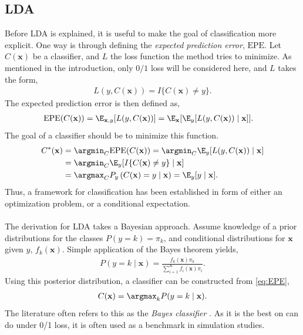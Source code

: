 \subsection{LDA}
\label{sub:LDA}
Before LDA is explained, it is useful to make the goal of classification more explicit. One way is through defining the \textit{expected prediction error}, $\mathrm{EPE}$.
Let $ C(\mathbf{x})$ be a classifier, and $L$ the loss function the method tries to minimize. As mentioned in the introduction, only $0/1$ loss will be considered here, and $L$ takes the form,
\begin{align}
  L(y, C(\mathbf{x})) = I\{ C(\mathbf{x}) \neq y \}. 
\end{align}
The expected prediction error is then defined as,
\begin{align}
  \mathrm{EPE}(C(\mathbf{x})) 
  &= \E_{\mathbf{x}, y}[L(y, C(\mathbf{x}))] = \E_{\mathbf{x}}[\E_{y}[L(y, C(\mathbf{x})) \mid  \mathbf{x}]].
\end{align}
The goal of a classifier should be to minimize this function.
\begin{align}
  C^*(\mathbf{x}) 
  &= \argmin_{ C} \mathrm{EPE}(C(\mathbf{x})) = \argmin_{ C} \E_{y}[L(y,  C(\mathbf{x})) \mid  \mathbf{x}] \notag \\
  &= \argmin_{ C} \E_{y}[I\{ C(\mathbf{x}) \neq y \} \mid  \mathbf{x}] \notag \\
  \label{eq:EPE} 
  &= \argmax_{ C} P_{y}\left( C(\mathbf{x}) = y  \mid  \mathbf{x}  \right) = \E_y [y \mid  \mathbf{x}].
\end{align}
Thus, a framework for classification has been established in form of either an optimization problem, or a conditional expectation.
\\
\\
The derivation for LDA takes a Bayesian approach. 
Assume knowledge of a prior distributions for the classes $P(y = k) = \pi_k$, and conditional distributions for $\mathbf{x}$ given $y$, $f_k(\mathbf{x})$. Simple application of the Bayes theorem yields,
\begin{align}
  P(y=k\mid \mathbf{x}) = \frac{f_k(\mathbf{x}) \pi_k}{\sum^{K}_{i=1} f_i(\mathbf{x})\pi_i} .
\end{align}
Using this posterior distribution, a classifier can be constructed from \eqref{eq:EPE},
\begin{align}
  \label{eq:bayesian} 
  C(\mathbf{x}) = \argmax_k P(y=k\mid \mathbf{x}).
\end{align}
The literature often refers to this as the \textit{Bayes classifier} \cite{modstat}. As it is the best on can do under 0/1 loss, it is often used as a benchmark in simulation studies. 

